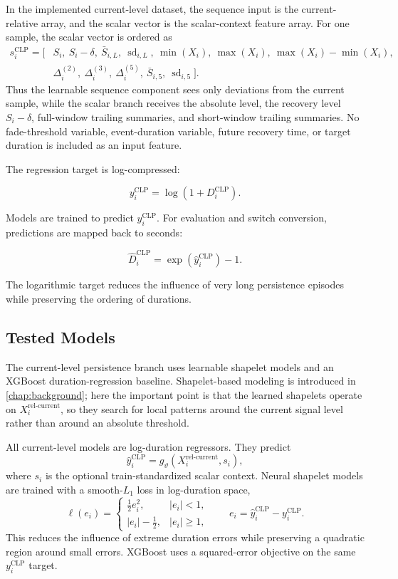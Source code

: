 In the implemented current-level dataset, the sequence input is the
current-relative array, and the scalar vector is the scalar-context feature
array. For one sample, the scalar vector is ordered as
\[
\begin{aligned}
  s_i^{\text{CLP}} = [
  &S_i,\ S_i-\delta,\ \bar{S}_{i,L},\
  \operatorname{sd}_{i,L},\
  \min(X_i),\ \max(X_i),\
  \max(X_i)-\min(X_i),\\
  &\Delta_i^{(2)},\ \Delta_i^{(3)},\ \Delta_i^{(5)},\
  \bar{S}_{i,5},\ \operatorname{sd}_{i,5}
  ] .
\end{aligned}
\]
Thus the learnable sequence component sees only deviations from the current
sample, while the scalar branch receives the absolute level, the recovery level
\(S_i-\delta\), full-window trailing summaries, and short-window trailing
summaries. No fade-threshold variable, event-duration variable, future recovery
time, or target duration is included as an input feature.

The regression target is log-compressed:

\[
  y_i^{\text{CLP}} = \log(1+D_i^{\text{CLP}}).
\]

Models are trained to predict \(y_i^{\text{CLP}}\). For evaluation and switch
conversion, predictions are mapped back to seconds:

\[
  \widehat{D}_i^{\text{CLP}}
  =
  \exp(\widehat{y}_i^{\text{CLP}})-1 .
\]

The logarithmic target reduces the influence of very long persistence episodes
while preserving the ordering of durations.

\subsection{Tested Models}

The current-level persistence branch uses learnable shapelet models and an
XGBoost duration-regression baseline. Shapelet-based modeling is introduced in
\cref{chap:background}; here the important point is that the learned shapelets
operate on \(X_i^{\text{rel-current}}\), so they search for local patterns around
the current signal level rather than around an absolute threshold.

All current-level models are log-duration regressors. They predict
\[
  \widehat{y}_i^{\text{CLP}} = g_\vartheta(X_i^{\text{rel-current}},s_i),
\]
where \(s_i\) is the optional train-standardized scalar context. Neural
shapelet models are trained with a smooth-\(L_1\) loss in log-duration space,
\[
  \ell(e_i)
  =
  \begin{cases}
    \frac{1}{2}e_i^2, & |e_i|<1,\\
    |e_i|-\frac{1}{2}, & |e_i|\ge 1,
  \end{cases}
  \qquad
  e_i = \widehat{y}_i^{\text{CLP}}-y_i^{\text{CLP}} .
\]
This reduces the influence of extreme duration errors while preserving a
quadratic region around small errors. XGBoost uses a squared-error objective on
the same \(y_i^{\text{CLP}}\) target.

